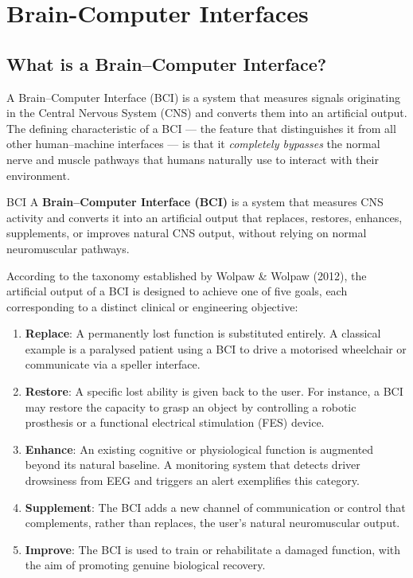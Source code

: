 \documentclass[10pt, letterpaper]{report}
\begin{document}
\chapter{Brain-Computer Interfaces}
\section{What is a Brain--Computer Interface?}



A Brain--Computer Interface (BCI) is a system that measures signals originating in the
Central Nervous System (CNS) and converts them into an artificial output. The defining
characteristic of a BCI — the feature that distinguishes it from all other human--machine
interfaces — is that it \emph{completely bypasses} the normal nerve and muscle pathways
that humans naturally use to interact with their environment.

\begin{boxdefinition}{BCI}{}
A \textbf{Brain--Computer Interface (BCI)} is a system that measures CNS activity and
converts it into an artificial output that replaces, restores, enhances, supplements, or
improves natural CNS output, without relying on normal neuromuscular pathways.
\end{boxdefinition}



According to the taxonomy established by Wolpaw \& Wolpaw (2012), the artificial output of a
BCI is designed to achieve one of five goals, each corresponding to a distinct clinical or
engineering objective:

\begin{enumerate}
  \item \textbf{Replace}: A permanently lost function is substituted entirely. A classical
  example is a paralysed patient using a BCI to drive a motorised wheelchair or
  communicate via a speller interface.

  \item \textbf{Restore}: A specific lost ability is given back to the user. For instance, a
  BCI may restore the capacity to grasp an object by controlling a robotic prosthesis or
  a functional electrical stimulation (FES) device.

  \item \textbf{Enhance}: An existing cognitive or physiological function is augmented
  beyond its natural baseline. A monitoring system that detects driver drowsiness from
  EEG and triggers an alert exemplifies this category.

  \item \textbf{Supplement}: The BCI adds a new channel of communication or control
  that complements, rather than replaces, the user's natural neuromuscular output.

  \item \textbf{Improve}: The BCI is used to train or rehabilitate a damaged function,
  with the aim of promoting genuine biological recovery.
\end{enumerate}
\end{document}
